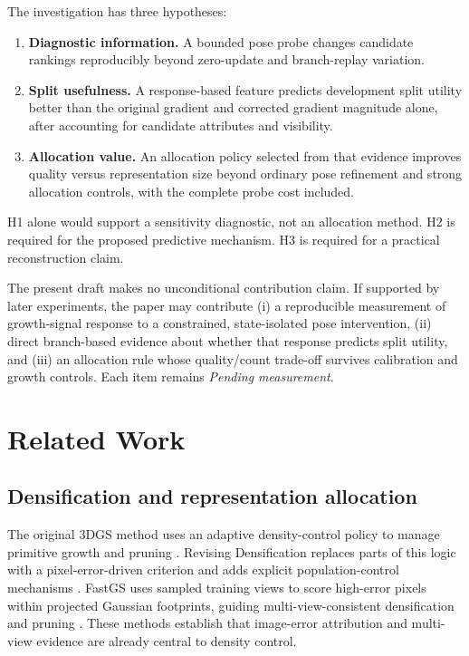 \documentclass[10pt]{article}
\newcommand{\pending}{\textit{Pending measurement}}
\begin{document}
The investigation has three hypotheses:
\begin{enumerate}[label=\textbf{H\arabic*:},leftmargin=2.1em]
  \item \textbf{Diagnostic information.} A bounded pose probe changes
  candidate rankings reproducibly beyond zero-update and branch-replay
  variation.
  \item \textbf{Split usefulness.} A response-based feature predicts
  development split utility better than the original gradient and corrected
  gradient magnitude alone, after accounting for candidate attributes and
  visibility.
  \item \textbf{Allocation value.} An allocation policy selected from that
  evidence improves quality versus representation size beyond ordinary pose
  refinement and strong allocation controls, with the complete probe cost
  included.
\end{enumerate}
H1 alone would support a sensitivity diagnostic, not an allocation method.
H2 is required for the proposed predictive mechanism. H3 is required for a
practical reconstruction claim.

The present draft makes no unconditional contribution claim. If supported by
later experiments, the paper may contribute (i) a reproducible measurement of
growth-signal response to a constrained, state-isolated pose intervention,
(ii) direct branch-based evidence about whether that response predicts split
utility, and (iii) an allocation rule whose quality/count trade-off survives
calibration and growth controls. Each item remains \pending{}.

\section{Related Work}

\subsection{Densification and representation allocation}

The original 3DGS method uses an adaptive density-control policy to manage
primitive growth and pruning \cite{kerbl2023}. Revising Densification replaces
parts of this logic with a pixel-error-driven criterion and adds explicit
population-control mechanisms \cite{rota2024}. FastGS uses sampled training
views to score high-error pixels within projected Gaussian footprints, guiding
multi-view-consistent densification and pruning \cite{ren2025fastgs}. These
methods establish that image-error attribution and multi-view evidence are
already central to density control.
\end{document}
